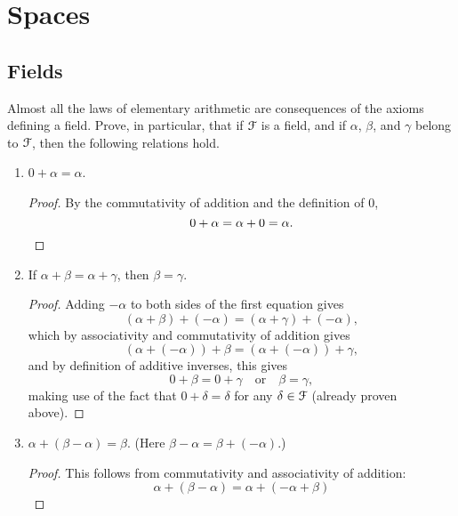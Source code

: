 \chapter{Spaces}

\section{Fields}

 Almost all the laws of elementary arithmetic are
consequences of the axioms defining a field. Prove, in particular,
that if $\mathcal{F}$ is a field, and if $\alpha$, $\beta$, and $\gamma$ belong
to $\mathcal{F}$, then the following relations hold.
\begin{enumerate}
\item $0 + \alpha = \alpha$.
  \begin{proof}
    By the commutativity of addition and the definition of $0$,
    \begin{equation*}
      0 + \alpha = \alpha + 0 = \alpha. \qedhere
    \end{equation*}
  \end{proof}
\item If $\alpha + \beta = \alpha + \gamma$, then $\beta = \gamma$.
  \begin{proof}
    Adding $-\alpha$ to both sides of the first equation gives
    \begin{equation*}
      (\alpha + \beta) + (-\alpha) = (\alpha + \gamma) + (-\alpha),
    \end{equation*}
    which by associativity and commutativity of addition gives
    \begin{equation*}
      (\alpha + (-\alpha)) + \beta = (\alpha + (-\alpha)) + \gamma,
    \end{equation*}
    and by definition of additive inverses, this gives
    \begin{equation*}
      0 + \beta = 0 + \gamma
      \quad\text{or}\quad
      \beta = \gamma,
    \end{equation*}
    making use of the fact that $0 + \delta = \delta$ for any
    $\delta\in\mathcal{F}$ (already proven above).
  \end{proof}
\item $\alpha + (\beta - \alpha) = \beta$. (Here
  $\beta - \alpha = \beta + (-\alpha)$.)
  \begin{proof}
    This follows from commutativity and associativity of addition:
    \begin{equation*}
      \alpha + (\beta - \alpha)
      = \alpha + (-\alpha + \beta)

\end{equation*}
\end{proof}
\end{enumerate}
